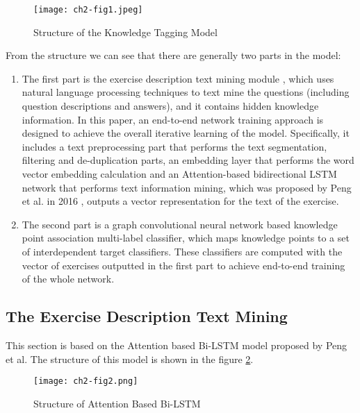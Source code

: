 \begin{figure}[h]
  \centering
  \texttt{[image: ch2-fig1.jpeg]}
  \caption{Structure of the Knowledge Tagging Model}
  \label{ch2-fig1}
\end{figure}




From the structure we can see that there are generally two parts in the model: 
\begin{enumerate}
	\item The first part is the exercise description text mining module , which uses natural language processing techniques to text mine the questions (including question descriptions and answers), and it contains hidden knowledge information. In this paper, an end-to-end network training approach is designed to achieve the overall iterative learning of the model. Specifically, it includes a text preprocessing part that performs the text segmentation, filtering and de-duplication parts, an embedding layer that performs the word vector embedding calculation and an Attention-based bidirectional LSTM network that performs text information mining, which was proposed by Peng et al. in 2016 \cite{ zhou2016attention}, outputs a vector representation for the text of the exercise.
	\item The second part is a graph convolutional neural network based knowledge point association multi-label classifier, which maps knowledge points to a set of interdependent target classifiers. These classifiers are computed with the vector of exercises outputted in the first part to achieve end-to-end training of the whole network. 
\end{enumerate}


\subsection{The Exercise Description Text Mining}
This section is based on the Attention based Bi-LSTM model proposed by Peng et al. The structure of this model is shown in the figure \ref{ch2-fig2}.
\begin{figure}[h]
	\centering
	\texttt{[image: ch2-fig2.png]}
	\caption{Structure of Attention Based Bi-LSTM}
	\label{ch2-fig2}
  \end{figure}

